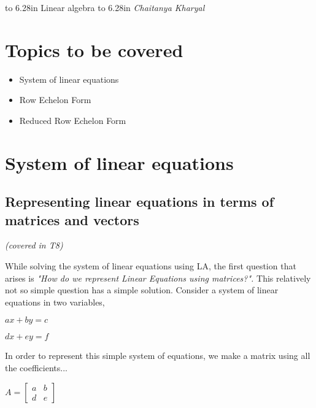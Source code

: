 \documentclass[a4paper]{article}
\begin{document}
\pagestyle{myheadings}
   \thispagestyle{plain}
   \newpage
   \noindent
   \begin{center}
   \framebox
   {
      \vbox{\vspace{2mm}
        \hbox to 6.28in { {\Large \hfill Linear algebra \hfill} } %
        \vspace{2mm}
        \hbox to 6.28in { {\it Chaitanya Kharyal\hfill} } %
        \vspace{2mm}}
   }
   \end{center}
   \markboth{}{} %

\section{Topics to be covered}
\begin{itemize}
    \item System of linear equations
    \item Row Echelon Form
    \item Reduced Row Echelon Form
\end{itemize}

\section{System of linear equations}
\subsection{Representing linear equations in terms of matrices and vectors}
\textit{(covered in T8)}

While solving the system of linear equations using LA, the first question that arises is \textit{"How do we represent Linear Equations using matrices?".} This relatively not so simple question has a simple solution. Consider a system of linear equations in two variables,
\begin{center}
    $ax + by = c$
    
    $dx + ey = f$
\end{center}

In order to represent this simple system of equations, we make a matrix using all the coefficients...
\begin{center}
    $A = \begin{bmatrix}
        a & b \\
        d & e 
    \end{bmatrix}$
\end{center}
\end{document}
